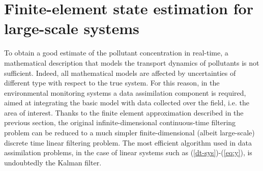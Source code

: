 \documentclass[journal]{IEEEtran}
\begin{document}
\section{Finite-element state estimation for large-scale systems}
To obtain a good estimate of the pollutant concentration in real-time, a mathematical description that models the transport dynamics of pollutants is not sufficient. Indeed, all mathematical models are 
		affected by uncertainties of different type with respect to the true system. For this reason, in the environmental monitoring systems a data assimilation component is required, aimed at integrating the 
		basic model with data collected over the field, i.e. the area of interest.
		Thanks to the finite element approximation described in the previous section, the original infinite-dimensional continuous-time filtering problem can 
	be reduced to a much simpler finite-dimensional (albeit large-scale) discrete time linear filtering problem.
		The most efficient algorithm used in  data assimilation problems, in the case of linear systems such as (\ref{dt-sys})-(\ref{eq:y}),  is undoubtedly the Kalman filter. 
	
\end{document}
